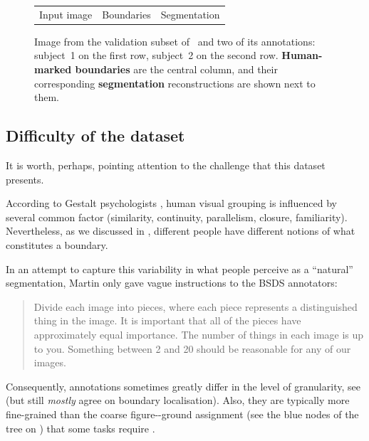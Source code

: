 \begin{figure}[t]
\begin{center}
\begin{tabular}{ c c c }
  Input image & Boundaries & Segmentation \\
  \end{tabular}
\end{center}
\caption[Two annotations from the BSDS500 dataset]{Image from the validation subset of~\cite{BSDS500resources} and two of its annotations: subject~1 on the first row, subject~2 on the second row. {\bf Human-marked boundaries} are the central column, and their corresponding {\bf segmentation} reconstructions are shown %
next to them.}
\label{fig:BSDS-annotations}
\end{figure}

\subsection*{Difficulty of the dataset}
It is worth, perhaps, pointing attention to the challenge that this dataset presents.

According to Gestalt psychologists \cite{Wertheimer1923untersuchungen,Kohler1929task,Koffka1935principles,Wertheimer1938laws}, human visual grouping is influenced by several common factor (\eg similarity, continuity, parallelism, closure, familiarity). Nevertheless, as we discussed in , different people have different notions of what constitutes a boundary. %

In an attempt to capture this variability in what people perceive as a ``natural'' segmentation, Martin \etal \cite{Martin01} only gave vague instructions to the BSDS annotators: \begin{quote}Divide each image into pieces, where each piece represents a distinguished thing in the image. It is important that all of the pieces have approximately equal importance. The number of things in each image is up to you. Something between 2 and 20 should be reasonable for any of our images.\end{quote}

Consequently, annotations sometimes greatly differ in the level of granularity, see  (but still {\it mostly} agree on boundary localisation). Also, they are typically more fine-grained than the coarse %
figure-\vs-ground assignment (see the blue nodes of the tree on ) that some tasks require \cite{Ren2006figure,Sundberg2011occlusion}.

